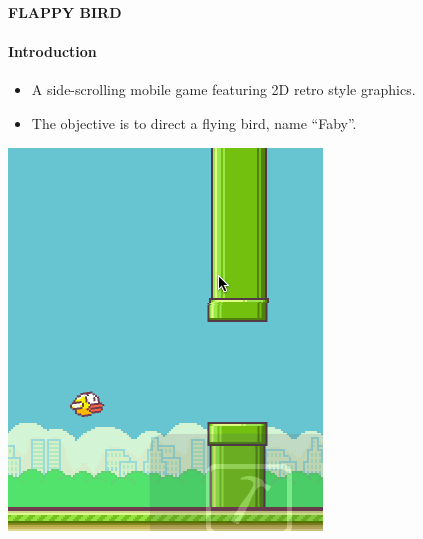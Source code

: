 \documentclass[10pt]{beamer}
\begin{document}
{
%
\begin{frame}{\textbf{FLAPPY BIRD}}
    \framesubtitle{\textbf{Introduction}}
\begin{itemize}
\item A side-scrolling mobile game featuring 2D retro style graphics.
\item The objective is to direct a flying bird, name “Faby”.
\end{itemize}
\vspace{1cm}
\pause
\includegraphics[scale=0.35]{pipes2.png}
\end{frame}
}
\end{document}
